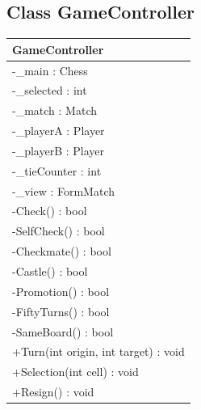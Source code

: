 \documentclass[12pt]{article}
\begin{document}
\newpage


\subsection{Class GameController}

\begin{table}[H]
    \begin{tabular}{|l|}
    \hline
    \rowcolor[HTML]{C0C0C0} 
    \textbf{GameController}              \\ \hline
    \rowcolor[HTML]{EFEFEF} 
    -\_main : Chess                      \\ \hline
    \rowcolor[HTML]{EFEFEF} 
    -\_selected : int                    \\ \hline
    \rowcolor[HTML]{EFEFEF} 
    -\_match : Match                     \\ \hline
    \rowcolor[HTML]{EFEFEF} 
    -\_playerA : Player                  \\ \hline
    \rowcolor[HTML]{EFEFEF} 
    -\_playerB : Player                  \\ \hline
    \rowcolor[HTML]{EFEFEF} 
    -\_tieCounter : int                  \\ \hline
    \rowcolor[HTML]{EFEFEF} 
    -\_view : FormMatch                  \\ \hline
    -Check() : bool                      \\ \hline
    -SelfCheck() : bool                  \\ \hline
    -Checkmate() : bool                  \\ \hline
    -Castle() : bool                     \\ \hline
    -Promotion() : bool                  \\ \hline
    -FiftyTurns() : bool                 \\ \hline
    -SameBoard() : bool                  \\ \hline
    +Turn(int origin, int target) : void \\ \hline
    +Selection(int cell) : void          \\ \hline
    +Resign() : void                     \\ \hline
    \end{tabular}
\end{table}

\newpage

\end{document}
